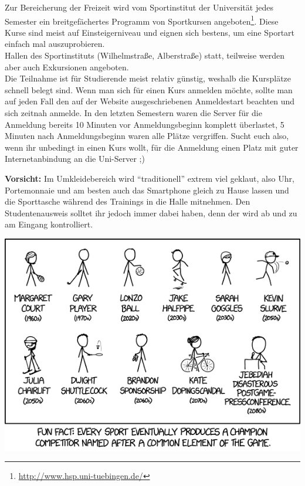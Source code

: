 Zur Bereicherung der Freizeit wird vom Sportinstitut der Universität jedes
Semester ein breitgefächertes Programm von Sportkursen
angeboten\footnote{\url{http://www.hsp.uni-tuebingen.de/}}. Diese Kurse sind
meist auf Einsteigerniveau und eignen sich bestens, um eine Sportart einfach
mal auszuprobieren.\\	%
Hallen des Sportinstituts (Wilhelmstraße, Alberstraße) statt, teilweise werden
aber auch Exkursionen angeboten.\\
Die Teilnahme ist für Studierende meist relativ günstig, weshalb die Kursplätze
schnell belegt sind. Wenn man sich für einen Kurs anmelden möchte, sollte man
auf jeden Fall den auf der Website ausgeschriebenen Anmeldestart beachten und
sich zeitnah anmelde. In den letzten Semestern waren die Server für die
Anmeldung bereits 10 Minuten vor Anmeldungsbeginn komplett überlastet, 5
Minuten nach Anmeldungsbeginn waren alle Plätze vergriffen. Sucht euch also,
wenn ihr unbedingt in einen Kurs wollt, für die Anmeldung einen Platz mit guter
Internetanbindung an die Uni-Server ;)

\textbf{Vorsicht:} Im Umkleidebereich wird "`traditionell"' extrem viel
  geklaut, also Uhr, Portemonnaie und am besten auch das Smartphone gleich
  zu Hause lassen und die Sporttasche wäh\-rend des Trainings in
  die Halle mitnehmen. Den Studentenausweis solltet ihr jedoch immer dabei haben, 
  denn der wird ab und zu am Eingang kontrolliert.
 


\begin{center}
\includegraphics[width=0.5\hsize]{info/xkcd/sports_champions.png}
\end{center}
